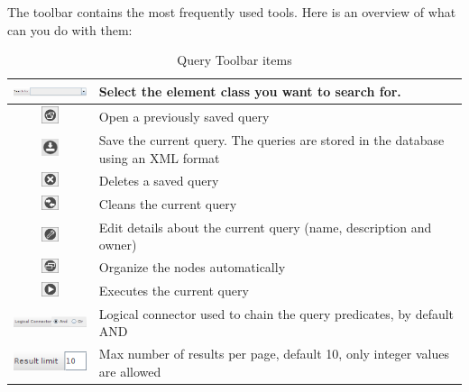 \documentclass[a4paper]{article}
\begin{document}
	The toolbar contains the most frequently used tools. Here is an overview of what can you do with them:
	\begin{table}[h!]
		\centering
		\begin{tabular}{cl}
			\includegraphics[width=3cm]{img/icon_select_class_query.png} & Select the element class you want to search for. \\
			\midrule
			\includegraphics[width=0.5cm]{img/icon_open.png} & Open a previously saved query\\
			\midrule
			\includegraphics[width=0.5cm]{img/icon_save_view.png} & Save the current query. The queries are stored in the database using an XML format\\
			\midrule
			\includegraphics[width=0.5cm]{img/icon_delete_saved_view.png} & Deletes a saved query\\
			\midrule
			\includegraphics[width=0.5cm]{img/icon_clean_query.png} & Cleans the current query\\
			\midrule
			\includegraphics[width=0.5cm]{img/icon_edit_saved_query.png} & Edit details about the current query (name, description and owner)\\
			\midrule
			\includegraphics[width=0.5cm]{img/icon_reorganize_nodes.png} & Organize the nodes automatically\\
			\midrule
			\includegraphics[width=0.5cm]{img/icon_execute_query.png} & Executes the current query\\
			\midrule
			\includegraphics[width=2.2cm]{img/icon_logical_connector_query.png} & Logical connector used to chain the query predicates, by default AND\\
			\midrule
			\includegraphics[width=2.2cm]{img/icon_result_limit_query.png} & Max number of results per page, default 10, only integer values are allowed\\
		\end{tabular}	
		\caption{Query Toolbar items}
		\label{tab:query_toolbar_icons}
	\end{table}
	
\end{document}

